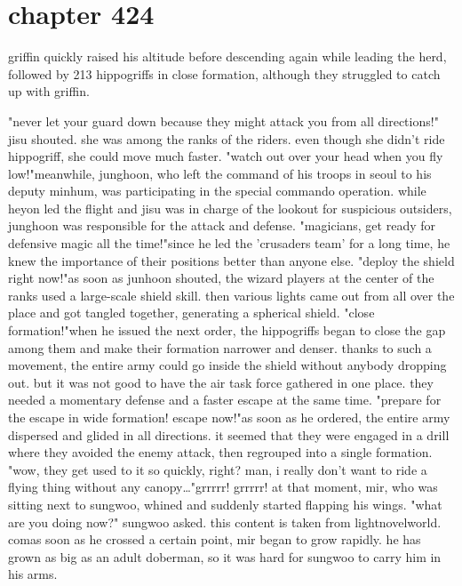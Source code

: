 \section{chapter 424}

griffin quickly raised his altitude before descending again while leading the herd, followed by 213 hippogriffs in close formation, although they struggled to catch up with griffin.





"never let your guard down because they might attack you from all directions!" jisu shouted.
she was among the ranks of the riders.
 even though she didn't ride hippogriff, she could move much faster.
"watch out over your head when you fly low!"meanwhile, junghoon, who left the command of his troops in seoul to his deputy minhum, was participating in the special commando operation.
while heyon led the flight and jisu was in charge of the lookout for suspicious outsiders, junghoon was responsible for the attack and defense.
"magicians, get ready for defensive magic all the time!"since he led the 'crusaders team' for a long time, he knew the importance of their positions better than anyone else.
"deploy the shield right now!"as soon as junhoon shouted, the wizard players at the center of the ranks used a large-scale shield skill.
 then various lights came out from all over the place and got tangled together, generating a spherical shield.
"close formation!"when he issued the next order, the hippogriffs began to close the gap among them and make their formation narrower and denser.
 thanks to such a movement, the entire army could go inside the shield without anybody dropping out.
but it was not good to have the air task force gathered in one place.
 they needed a momentary defense and a faster escape at the same time.
"prepare for the escape in wide formation! escape now!"as soon as he ordered, the entire army dispersed and glided in all directions.
it seemed that they were engaged in a drill where they avoided the enemy attack, then regrouped into a single formation.
"wow, they get used to it so quickly, right? man, i really don't want to ride a flying thing without any canopy…"grrrrr! grrrrr!
at that moment, mir, who was sitting next to sungwoo, whined and suddenly started flapping his wings.
"what are you doing now?" sungwoo asked.
this content is taken from lightnovelworld.
c‌omas soon as he crossed a certain point, mir began to grow rapidly.
 he has grown as big as an adult doberman, so it was hard for sungwoo to carry him in his arms.
